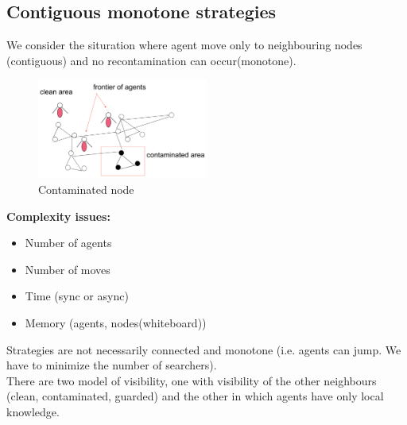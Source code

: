 \documentclass[paper=a4, fontsize=11pt]{scrartcl} %
\numberwithin{equation}{section} %
\numberwithin{figure}{section} %
\numberwithin{table}{section} %
\begin{document}
\subsection*{Contiguous monotone strategies}
We consider the situration where agent move only to neighbouring nodes (contiguous) and no recontamination can occur(monotone).
\begin{figure}[H]
  \centering
  \includegraphics[width=0.5\textwidth]{img/cont_2.png}
  \caption{Contaminated node}
  \label{fig:boat1}
\end{figure}
\textbf{Complexity issues:}
\begin{itemize}
\item Number of agents
\item Number of moves
\item Time (sync or async)
\item Memory (agents, nodes(whiteboard))
\end{itemize}
Strategies are not necessarily connected and monotone (i.e. agents can jump. We have to minimize the number of searchers).\\
There are two model of visibility, one with visibility of the other neighbours (clean, contaminated, guarded) and the other in which agents have only local knowledge.
\end{document}
